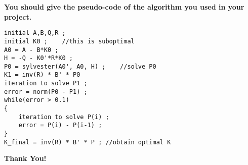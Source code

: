 \documentclass[blue,mathserif,envcountsect,compress,10pt,xcolor=pdftex,dvipsnames,table]{beamer}
\begin{document}
\begin{frame}[fragile]
\textbf{You should give the pseudo-code of the algorithm you used in your project.}

\begin{lstlisting}
initial A,B,Q,R ;
initial K0 ;	//this is suboptimal
A0 = A - B*K0 ;
H = -Q - K0'*R*K0 ;
P0 = sylvester(A0', A0, H) ;	//solve P0
K1 = inv(R) * B' * P0
iteration to solve P1 ;
error = norm(P0 - P1) ;
while(error > 0.1)
{
	iteration to solve P(i) ;
	error = P(i) - P(i-1) ;
}
K_final = inv(R) * B' * P ;	//obtain optimal K

\end{lstlisting}
\end{frame}

\begin{frame}{}%
\thispagestyle{empty}%

\begin{center}
{\huge\bf\color{blue} Thank You!}
\end{center}

\end{frame}
\end{document}
